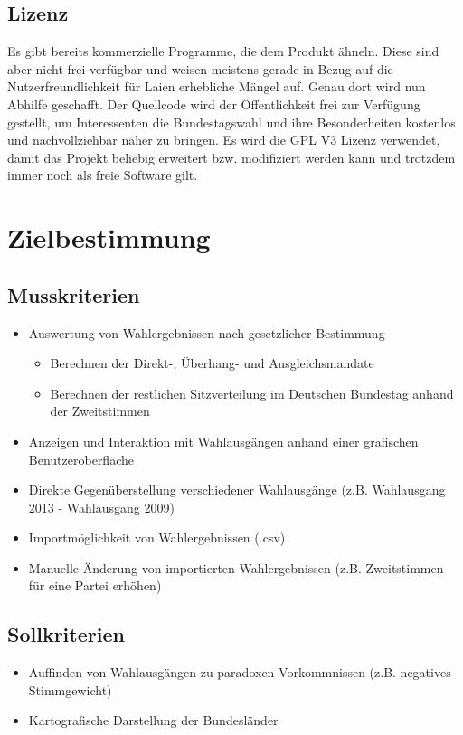 \documentclass[10pt,a4paper]{article}
\begin{document}
\subsection{Lizenz}
Es gibt bereits kommerzielle Programme, die dem Produkt ähneln. Diese sind aber nicht frei verfügbar und weisen meistens gerade in Bezug auf die Nutzerfreundlichkeit für Laien erhebliche Mängel auf. Genau dort wird nun Abhilfe geschafft.\newline
Der Quellcode wird der Öffentlichkeit frei zur Verfügung gestellt, um Interessenten die Bundestagswahl und ihre Besonderheiten kostenlos und nachvollziehbar näher zu bringen. Es wird die GPL V3 Lizenz verwendet, damit das Projekt beliebig erweitert bzw. modifiziert werden kann und trotzdem immer noch als freie Software gilt.



\section{Zielbestimmung}
\subsection{Musskriterien}
\begin{itemize}
\item Auswertung von Wahlergebnissen nach gesetzlicher Bestimmung
\begin{itemize}
\item Berechnen der Direkt-, Überhang- und Ausgleichsmandate
\item Berechnen der restlichen Sitzverteilung im Deutschen Bundestag anhand der Zweitstimmen
\end{itemize}
\item Anzeigen und Interaktion mit Wahlausgängen anhand einer grafischen Benutzeroberfläche
\item Direkte Gegenüberstellung verschiedener Wahlausgänge (z.B. Wahlausgang 2013 - Wahlausgang 2009)
\item Importmöglichkeit von Wahlergebnissen (.csv)
\item Manuelle Änderung von importierten Wahlergebnissen (z.B. Zweitstimmen für eine Partei erhöhen)
\end{itemize}

\subsection{Sollkriterien}
\begin{itemize}
\item Auffinden von Wahlausgängen zu paradoxen Vorkommnissen (z.B. negatives Stimmgewicht)
\item Kartografische Darstellung der Bundesländer
\end{itemize}
\end{document}
